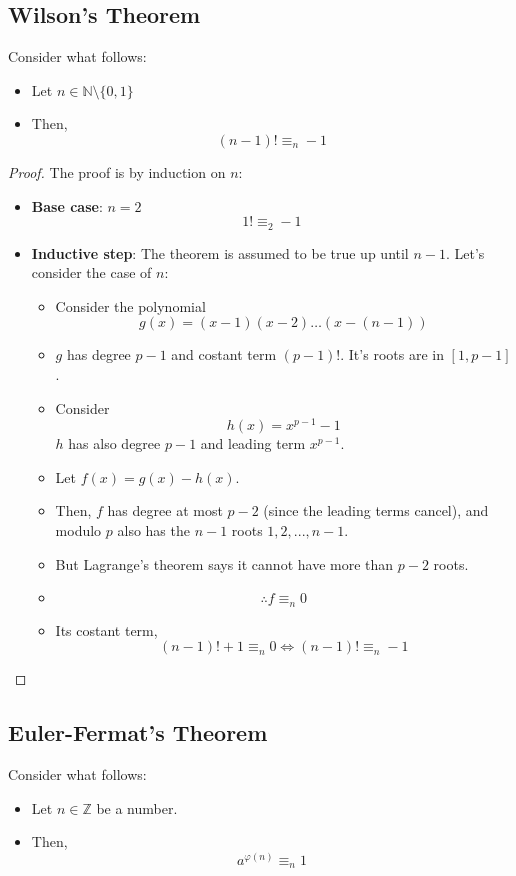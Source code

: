 \subsection{Wilson's Theorem}\label{wilson_th}
\begin{theorem}
    Consider what follows:
    \begin{itemize}
        \item Let $n \in \mathbb{N} \setminus \{0,1\}$
        \item Then, \[(n-1)! \equiv_{n} -1\]
    \end{itemize}
\end{theorem}
\begin{proof}
    The proof is by induction on $n$:
    \begin{itemize}
        \item \textbf{Base case}: $n = 2$
        \[1! \equiv_{2} -1\]
        \item \textbf{Inductive step}:
        The theorem is assumed to be true up until $n - 1$. Let's consider the case of $n$:
        \begin{itemize}
            \item Consider the polynomial \[g(x) = (x-1)(x-2) \dots (x - (n-1))\]
            \item $g$ has degree $p-1$ and costant term $(p-1)!$. It's roots are in $[1,p-1]$.
            \item Consider \[h(x) = x^{p-1} - 1\] $h$ has also degree $p-1$ and leading term $x^{p-1}$.
            \item Let $f(x) = g(x) - h(x)$.
            \item Then, $f$ has degree at most $p - 2$ (since the leading terms cancel), and modulo $p$ also has the $n - 1$ roots $1, 2, ..., n - 1$.
            \item But Lagrange's theorem says it cannot have more than $p - 2$ roots.
            \item \[\therefore f \equiv_{n} 0\]
            \item Its costant term, \[(n-1)! + 1 \equiv_{n} 0 \iff (n-1)! \equiv_{n} -1\]
        \end{itemize}
    \end{itemize}
\end{proof}

\subsection{Euler-Fermat's Theorem}\label{euler_fermat_th}
\begin{theorem}
    Consider what follows:
    \begin{itemize}
        \item Let $n \in \mathbb{Z}$ be a number.
        \item Then, \[a^{\varphi(n)} \equiv_{n} 1\]
    \end{itemize}
\end{theorem}


